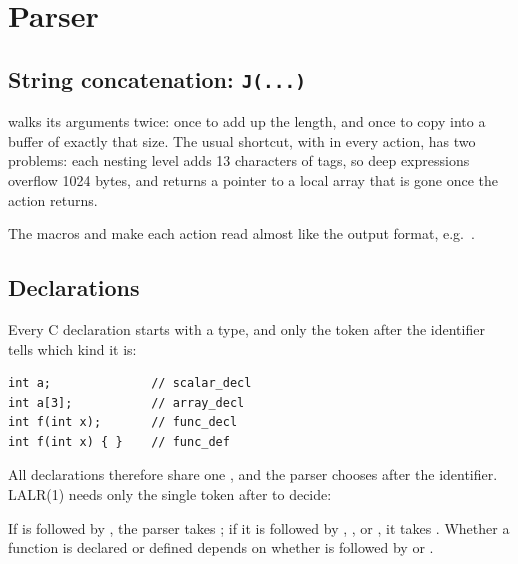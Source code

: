 \documentclass[12pt]{article}
\begin{document}

\section{Parser}

\subsection{String concatenation: \texttt{J(...)}}


 walks its arguments twice: once to add up the length, and once to copy into a buffer of exactly
that size. The usual shortcut,  with  in every action, has two problems:
each nesting level adds 13 characters of tags, so deep expressions overflow 1024 bytes, and
 returns a pointer to a local array that is gone once the action returns.

The macros  and  make each action read almost like the output format,
e.g.\ .


\subsection{Declarations}

Every C declaration starts with a type, and only the token after the identifier tells which kind it is:

\begin{lstlisting}[numbers=none]
int a;              // scalar_decl
int a[3];           // array_decl
int f(int x);       // func_decl
int f(int x) { }    // func_def
\end{lstlisting}

All declarations therefore share one , and the parser chooses after the identifier.
LALR(1) needs only the single token after  to decide:


If  is followed by \code{(}, the parser takes ; if it is followed by \code{;},
\code{,}, \code{=} or \code{[}, it takes . Whether a function is declared or defined
depends on whether \code{)} is followed by \code{;} or \code{\{}.
\end{document}
